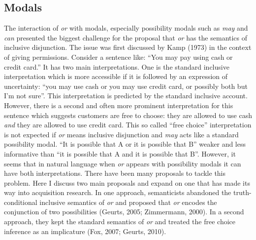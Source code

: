 \documentclass[oneside]{report}
\theoremstyle{definition}
\theoremstyle{definition}
\theoremstyle{definition}
\theoremstyle{remark}
\begin{document}
\subsection{Modals}\label{modals}

The interaction of \emph{or} with modals, especially possibility modals
such as \emph{may} and \emph{can} presented the biggest challenge for
the proposal that \emph{or} has the semantics of inclusive disjunction.
The issue was first discussed by Kamp (1973) in the context of giving
permissions. Consider a sentence like: ``You may pay using cash or
credit card.'' It has two main interpretations. One is the standard
inclusive interpretation which is more accessible if it is followed by
an expression of uncertainty: ``you may use cash or you may use credit
card, or possibly both but I'm not sure''. This interpretation is
predicted by the standard inclusive account. However, there is a second
and often more prominent interpretation for this sentence which suggests
customers are free to choose: they are allowed to use cash \emph{and}
they are allowed to use credit card. This so called ``free choice''
interpretation is not expected if \emph{or} means inclusive disjunction
and \emph{may} acts like a standard possibility modal. ``It is possible
that A or it is possible that B'' weaker and less informative than ``it
is possible that A and it is possible that B''. However, it seems that
in natural language when \emph{or} appears with possibility modals it
can have both interpretations. There have been many proposals to tackle
this problem. Here I discuss two main proposals and expand on one that
has made its way into acquisition research. In one approach,
semanticists abandoned the truth-conditional inclusive semantics of
\emph{or} and proposed that \emph{or} encodes the conjunction of two
possibilities (Geurts, 2005; Zimmermann, 2000). In a second approach,
they kept the standard semantics of \emph{or} and treated the free
choice inference as an implicature (Fox, 2007; Geurts, 2010).
\end{document}
